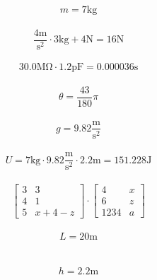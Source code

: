 \documentclass[]{report}
\begin{document}
$$m = 7 \mathrm{k g}$$\\$$\dfrac{4 \mathrm{ m}}{\mathrm{ s}^{2}}  \cdot 3 \mathrm{k g} + 4 \mathrm{ N} = 16 \mathrm{ N}$$\\$$30.0 \mathrm{M \Omega} \cdot 1.2 \mathrm{p F} = 0.000036 \mathrm{ s}$$\\$$\theta = \dfrac{43}{180}  \pi$$\\$$g = 9.82 \dfrac{\mathrm{ m}}{\mathrm{ s}^{2}} $$\\$$U = 7 \mathrm{k g} \cdot 9.82 \dfrac{\mathrm{ m}}{\mathrm{ s}^{2}}  \cdot 2.2 \mathrm{ m} = 151.228 \mathrm{ J}$$\\$$\begin{bmatrix}
	3    & 3    \\
	4    & 1    \\
	5    & x + 4 - z
\end{bmatrix}
	 \cdot \begin{bmatrix}
	4  & x  \\
	6  & z  \\
	1234& a  
\end{bmatrix}
	$$\\$$L = 20 \mathrm{ m}$$\\$$$$\\$$h = 2.2 \mathrm{ m}$$\\
\end{document}
